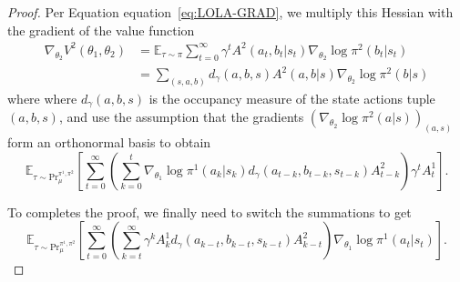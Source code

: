 \documentclass{article} \usepackage{iclr2025_conference,times}
\def\eqref#1{equation~\ref{#1}}
\begin{document}
\begin{proof}
Per Equation \eqref{eq:LOLA-GRAD}, we multiply this Hessian with the gradient of the value function
\begin{align}
    \nabla_{\theta_2}V^2(\theta_1,\theta_2) &= \mathbb{E}_{\tau \sim \pi} \sum_{t=0}^{\infty}\gamma^t A^2(a_t,b_t|s_t) \nabla_{\theta_2} \log \pi^2(b_t|s_t)\\
    &= \sum_{(s,a,b)} d_{\gamma}(a,b,s) A^2(a,b|s)\nabla_{\theta_2} \log \pi^2(b|s)
\end{align}
where where $d_{\gamma}(a,b,s)$ is the occupancy measure of the state actions tuple $(a,b,s)$, and use the assumption that the gradients $(\nabla_{\theta_2} \log \pi^2 (a|s))_{(a,s)}$ form an orthonormal basis to obtain
\[
    \mathbb{E}_{\tau \sim \text{Pr}_{\mu}^{\pi^1, \pi^2}}\left[\sum_{t=0}^\infty\left(\sum_{k=0}^t \nabla_{\theta_1}\log \pi^1(a_k|s_k)  d_{\gamma}(a_{t-k},b_{t-k},s_{t-k}) A^2_{t-k} \right) \gamma^t A^1_t\right].
\]

To completes the proof, we finally need to switch the summations to get 
\[
    \mathbb{E}_{\tau \sim \text{Pr}_{\mu}^{\pi^1, \pi^2}}\left[\sum_{t=0}^\infty\left(\sum_{k=t}^\infty\gamma^k A^1_k d_{\gamma}(a_{k-t},b_{k-t},s_{k-t}) A^2_{k-t} \right)  \nabla_{\theta_1}\log \pi^1(a_t|s_t) \right].
\]
\end{proof}
\end{document}
